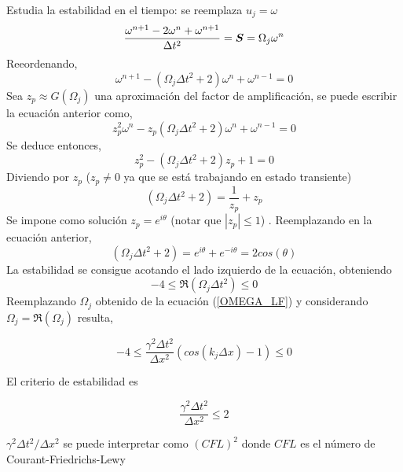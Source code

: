 Estudia la estabilidad en el tiempo: se reemplaza $u_{j} = \omega$
\begin{equation}
\dfrac{\omega^{n+1} -2\omega^{n} + \omega^{n+1}}{\Delta t^2} = \boldsymbol{S} = \Omega_j \omega^n
\end{equation}
Reeordenando,
\begin{equation}
\omega^{n+1} - (\Omega_j \Delta t^2 +2) \omega^n + \omega^{n-1}=0
\end{equation}
Sea $z_p \approx G(\Omega_j)$ una aproximación del factor de amplificación, se puede escribir la ecuación anterior como,
\begin{equation}
z_p^2 \omega^{n} - z_p (\Omega_j \Delta t^2 +2)  \omega^n + \omega^{n-1} = 0
\end{equation}
Se deduce entonces,
\begin{equation}
z_p^2 - \left( \Omega_j \Delta t^2 +2 \right) z_p + 1 = 0
\end{equation}
Diviendo por $z_p$ ($z_p \neq 0$  ya que se está trabajando en estado transiente)
\begin{equation}
\left( \Omega_j \Delta t^2 + 2 \right) = \dfrac{1}{z_p} + z_p
\end{equation}
Se impone como solución $z_p = e^{i \theta}$ (notar que $|z_p| \leq 1$) . Reemplazando en la ecuación anterior,
\begin{equation}
\left( \Omega_j \Delta t^2 + 2 \right) = e^{i \theta} + e^{-i \theta} = 2 cos(\theta)
\end{equation}
La estabilidad se consigue acotando el lado izquierdo de la ecuación, obteniendo
\begin{equation}
-4 \leq \Re(\Omega_j \Delta t^2) \leq 0 
\end{equation}
Reemplazando $\Omega_j$ obtenido de la ecuación (\ref{OMEGA_LF}) y considerando $\Omega_j = \Re (\Omega_j)$ resulta,

\begin{equation}
-4 \leq \dfrac{\gamma^2 \Delta t^2}{\Delta x^2} \left( cos(k_j \Delta x) - 1 \right)  \leq 0
\end{equation}

El criterio de estabilidad es

\begin{equation}
\dfrac{\gamma^2 \Delta t^2}{\Delta x^2} \leq 2
\end{equation}

$\gamma^2 \Delta t^2 / \Delta x^2 $ se puede interpretar como $(CFL)^2$ donde $CFL$ es el número de Courant-Friedrichs-Lewy

